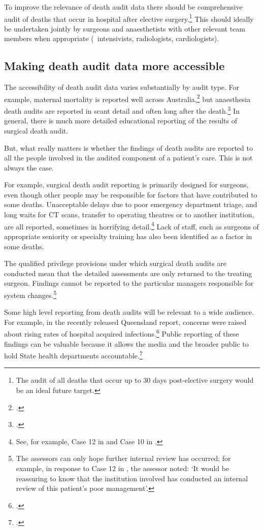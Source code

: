 \documentclass[FrontPage]{grattan}
\begin{document}
To improve the relevance of death audit data there should be comprehensive audit of deaths that occur in hospital after elective surgery.\footnote{The audit of  all deaths that occur up to 30 days post-elective surgery would be an ideal future target.}
This should ideally be undertaken jointly by surgeons and anaesthetists with other relevant team members when appropriate (\eg~intensivists, radiologists, cardiologists).

\subsection{Making death audit data more accessible}\label{subsec:deathaccess}
The accessibility of death audit data varies substantially by audit type. For example, maternal mortality is reported well across Australia,\footcite{humphrey2016maternal} 
but anaesthesia death audits are reported in scant detail and often long after the death.\footcite{mcnicol2014safety}
In general, there is much more detailed educational reporting of the results of surgical death audit.

But, what really matters is whether the findings of death audits are reported to all the people involved in the audited component of a patient’s care. This is not always the case. 

For example, surgical death audit reporting is primarily designed for surgeons, even though other people may be responsible for factors that have contributed to some deaths. Unacceptable delays due to poor emergency department triage, and long waits for CT scans, transfer to operating theatres or to another institution, are all reported, sometimes in horrifying detail.\footnote{See, for example, Case 12 in \textcite{VASM2012} and Case 10 in \textcite{VASM2014}.}
Lack of staff, such as surgeons of appropriate seniority or specialty training has also been identified as a factor in some deaths.

The qualified privilege provisions under which surgical death audits are conducted mean that the detailed assessments are only returned to the treating surgeon. Findings cannot be reported to the particular managers responsible for system changes.\footnote{The assessors can only hope further internal review has occurred; for example, in response to Case 12 in \textcite{VASM2012}, the assessor noted: ‘It would be reassuring to know that the institution involved has conducted an internal review of this patient’s poor management’.}

Some high level reporting from death audits will be relevant to a wide audience. For example, in the recently released Queensland report, concerns were raised about rising rates of hospital acquired infections.\footcite{QASM2017}
Public reporting of these findings can be valuable because it allows the media and the broader public to hold State health departments accountable.\footcite{vickery2017deaths}
\end{document}
